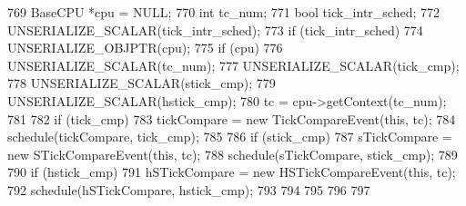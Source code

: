 \begin{DoxyCode}
{769     BaseCPU *cpu = NULL;
770     int tc_num;
771     bool tick_intr_sched;
772     UNSERIALIZE_SCALAR(tick_intr_sched);
773     if (tick_intr_sched) {
774         UNSERIALIZE_OBJPTR(cpu);
775         if (cpu) {
776             UNSERIALIZE_SCALAR(tc_num);
777             UNSERIALIZE_SCALAR(tick_cmp);
778             UNSERIALIZE_SCALAR(stick_cmp);
779             UNSERIALIZE_SCALAR(hstick_cmp);
780             tc = cpu->getContext(tc_num);
781 
782             if (tick_cmp) {
783                 tickCompare = new TickCompareEvent(this, tc);
784                 schedule(tickCompare, tick_cmp);
785             }
786             if (stick_cmp)  {
787                 sTickCompare = new STickCompareEvent(this, tc);
788                 schedule(sTickCompare, stick_cmp);
789             }
790             if (hstick_cmp)  {
791                 hSTickCompare = new HSTickCompareEvent(this, tc);
792                 schedule(hSTickCompare, hstick_cmp);
793             }
794         }
795     }
796 
797 }
\end{DoxyCode}



